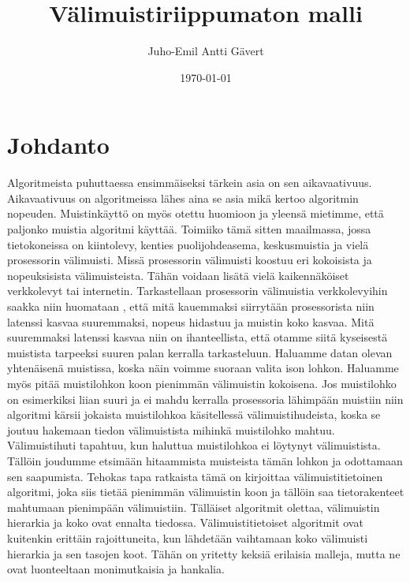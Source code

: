 \documentclass[finnish]{tktltiki2}
\title{Välimuistiriippumaton malli}
\author{Juho-Emil Antti Gävert}
\date{\today}
\theoremstyle{definition}
\theoremstyle{remark}
\begin{document}

\maketitle        %

\tableofcontents  %
\newpage          %






\section{Johdanto}
Algoritmeista puhuttaessa ensimmäiseksi tärkein asia on sen aikavaativuus.
Aikavaativuus on algoritmeissa lähes aina se asia mikä kertoo algoritmin
nopeuden.
Muistinkäyttö on myös otettu huomioon ja yleensä mietimme, että paljonko
muistia algoritmi käyttää. Toimiiko tämä sitten maailmassa, jossa tietokoneissa
on kiintolevy, kenties puolijohdeasema, keskusmuistia ja vielä prosessorin
välimuisti. Missä prosessorin välimuisti koostuu eri kokoisista ja
nopeuksisista välimuisteista.
Tähän voidaan lisätä vielä kaikennäköiset verkkolevyt tai internetin.
Tarkastellaan prosessorin välimuistia verkkolevyihin saakka niin huomataan
, että mitä kauemmaksi siirrytään prosessorista niin latenssi kasvaa
suuremmaksi, nopeus hidastuu ja muistin koko kasvaa. Mitä suuremmaksi latenssi
kasvaa niin on ihanteellista, että otamme siitä kyseisestä muistista tarpeeksi
suuren palan kerralla tarkasteluun. %
Haluamme datan olevan yhtenäisenä muistissa, koska näin voimme suoraan valita
ison lohkon. Haluamme myös pitää muistilohkon koon pienimmän
välimuistin kokoisena. Jos muistilohko on esimerkiksi liian suuri ja ei mahdu
kerralla prosessoria lähimpään muistiin niin algoritmi kärsii jokaista
muistilohkoa käsitellessä välimuistihudeista, koska se joutuu hakemaan tiedon
välimuistista mihinkä muistilohko mahtuu.
Välimuistihuti tapahtuu, kun haluttua muistilohkoa ei löytynyt välimuistista.
Tällöin joudumme etsimään hitaammista muisteista tämän lohkon ja odottamaan sen
saapumista. Tehokas tapa ratkaista tämä on kirjoittaa välimuistitietoinen
algoritmi, joka siis tietää pienimmän välimuistin koon ja tällöin saa
tietorakenteet mahtumaan pienimpään välimuistiin. Tälläiset algoritmit olettaa,
välimuistin hierarkia ja koko ovat ennalta tiedossa. Välimuistitietoiset
algoritmit ovat kuitenkin erittäin rajoittuneita, kun lähdetään vaihtamaan
koko välimuisti hierarkia ja sen tasojen koot. Tähän on yritetty keksiä
erilaisia malleja, mutta ne ovat luonteeltaan monimutkaisia ja hankalia.
\end{document}
